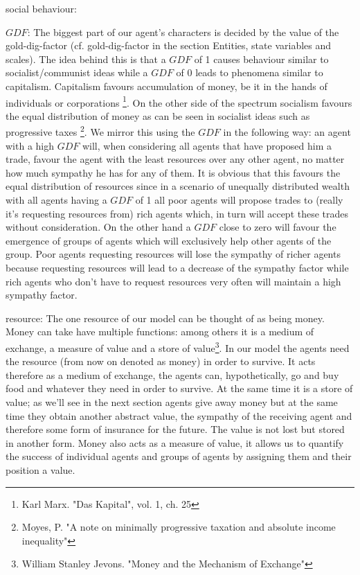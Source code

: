 \documentclass{JASSS}
\newcommand{\gdf}{\mathit{GDF}}
\begin{document}
	social behaviour:
	\begin{description*}
		\item[$\boldsymbol{\gdf}$:]
			The biggest part of our agent's characters is decided by the value of the gold-dig-factor (cf. gold-dig-factor in the section Entities, state variables and scales). The idea behind this is that a $\gdf$ of 1 causes behaviour similar to socialist/communist ideas while a $\gdf$ of 0 leads to phenomena similar to capitalism. Capitalism favours accumulation of money, be it in the hands of individuals or corporations \footnote{Karl Marx. "Das Kapital", vol. 1, ch. 25}. On the other side of the spectrum socialism favours the equal distribution of money as can be seen in socialist ideas such as progressive taxes \footnote{Moyes, P. "A note on minimally progressive taxation and absolute income inequality"}. We mirror this using the $\gdf$ in the following way: an agent with a high $\gdf$ will, when considering all agents that have proposed him a trade, favour the agent with the least resources over any other agent, no matter how much sympathy he has for any of them. It is obvious that this favours the equal distribution of resources since in a scenario of unequally distributed wealth with all agents having a $\gdf$ of 1 all poor agents will propose trades to (really it's requesting resources from) rich agents which, in turn will accept these trades without consideration. On the other hand a $\gdf$ close to zero will favour the emergence of groups of agents which will exclusively help other agents of the group. Poor agents requesting resources will lose the sympathy of richer agents because requesting resources will lead to a decrease of the sympathy factor while rich agents who don't have to request resources very often will maintain a high sympathy factor.
			
		\item[resource:]
			The one resource of our model can be thought of as being money. Money can take have multiple functions: among others it is a medium of exchange, a measure of value and a store of value\footnote{William Stanley Jevons. "Money and the Mechanism of Exchange"}. In our model the agents need the resource (from now on denoted as money) in order to survive. It acts therefore as a medium of exchange, the agents can, hypothetically, go and buy food and whatever they need in order to survive. At the same time it is a store of value; as we'll see in the next section agents give away money but at the same time they obtain another abstract value, the sympathy of the receiving agent and therefore some form of insurance for the future. The value is not lost but stored in another form. Money also acts as a measure of value, it allows us to quantify the success of individual agents and groups of agents by assigning them and their position a value.
			

\end{description*}
\end{document}
